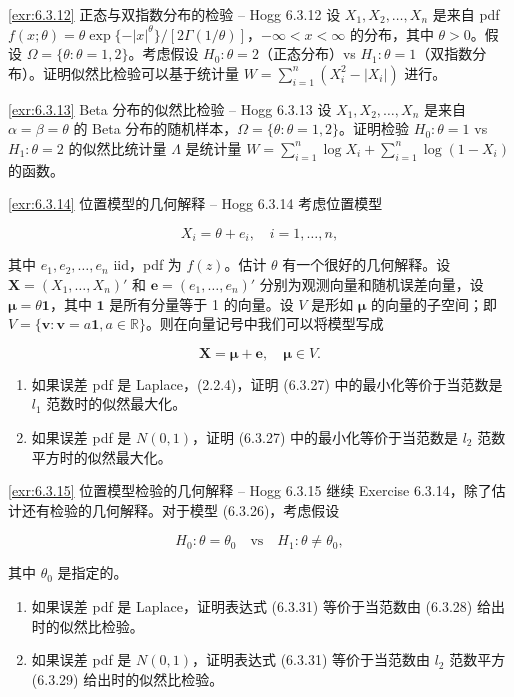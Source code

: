 \begin{exercise}{\ref{exr:6.3.12} 正态与双指数分布的检验 – Hogg 6.3.12}\label{exr:6.3.12}
设 $X_1, X_2, \ldots, X_n$ 是来自 pdf $f(x;\theta) = \theta\exp\{-|x|^\theta\}/[2\Gamma(1/\theta)]$，$-\infty < x < \infty$ 的分布，其中 $\theta > 0$。假设 $\Omega = \{\theta: \theta=1,2\}$。考虑假设 $H_0: \theta=2$（正态分布）vs $H_1: \theta=1$（双指数分布）。证明似然比检验可以基于统计量 $W = \sum_{i=1}^n (X_i^2 - |X_i|)$ 进行。
\end{exercise}

\begin{exercise}{\ref{exr:6.3.13} Beta 分布的似然比检验 – Hogg 6.3.13}\label{exr:6.3.13}
设 $X_1, X_2, \ldots, X_n$ 是来自 $\alpha=\beta=\theta$ 的 Beta 分布的随机样本，$\Omega = \{\theta: \theta=1,2\}$。证明检验 $H_0: \theta=1$ vs $H_1: \theta=2$ 的似然比统计量 $\Lambda$ 是统计量 $W = \sum_{i=1}^n \log X_i + \sum_{i=1}^n \log(1-X_i)$ 的函数。
\end{exercise}

\begin{exercise}{\ref{exr:6.3.14} 位置模型的几何解释 – Hogg 6.3.14}\label{exr:6.3.14}
考虑位置模型

\[
X_i = \theta + e_i, \quad i=1,\ldots,n,
\]

其中 $e_1, e_2, \ldots, e_n$ iid，pdf 为 $f(z)$。估计 $\theta$ 有一个很好的几何解释。设 $\mathbf{X} = (X_1, \ldots, X_n)'$ 和 $\mathbf{e} = (e_1, \ldots, e_n)'$ 分别为观测向量和随机误差向量，设 $\boldsymbol{\mu} = \theta\mathbf{1}$，其中 $\mathbf{1}$ 是所有分量等于 1 的向量。设 $V$ 是形如 $\boldsymbol{\mu}$ 的向量的子空间；即 $V = \{\mathbf{v}: \mathbf{v}=a\mathbf{1}, a \in \mathbb{R}\}$。则在向量记号中我们可以将模型写成

\[
\mathbf{X} = \boldsymbol{\mu} + \mathbf{e}, \quad \boldsymbol{\mu} \in V.
\]

\begin{enumerate}
\item[(a)] 如果误差 pdf 是 Laplace，(2.2.4)，证明 (6.3.27) 中的最小化等价于当范数是 $l_1$ 范数时的似然最大化。
\item[(b)] 如果误差 pdf 是 $N(0,1)$，证明 (6.3.27) 中的最小化等价于当范数是 $l_2$ 范数平方时的似然最大化。
\end{enumerate}
\end{exercise}

\begin{exercise}{\ref{exr:6.3.15} 位置模型检验的几何解释 – Hogg 6.3.15}\label{exr:6.3.15}
继续 Exercise 6.3.14，除了估计还有检验的几何解释。对于模型 (6.3.26)，考虑假设

\[
H_0: \theta = \theta_0 \quad \text{vs} \quad H_1: \theta \neq \theta_0,
\]

其中 $\theta_0$ 是指定的。

\begin{enumerate}
\item[(a)] 如果误差 pdf 是 Laplace，证明表达式 (6.3.31) 等价于当范数由 (6.3.28) 给出时的似然比检验。
\item[(b)] 如果误差 pdf 是 $N(0,1)$，证明表达式 (6.3.31) 等价于当范数由 $l_2$ 范数平方 (6.3.29) 给出时的似然比检验。
\end{enumerate}
\end{exercise}

